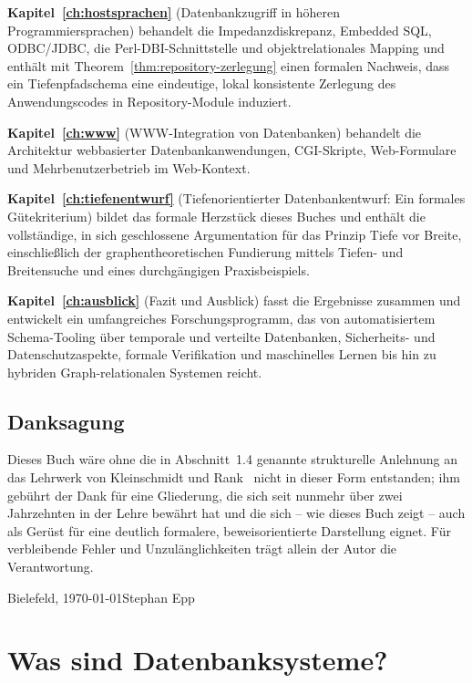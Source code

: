 ﻿\documentclass[a4paper,12pt]{report}
\theoremstyle{definition}
\theoremstyle{remark}
\begin{document}
\textbf{Kapitel~\ref{ch:hostsprachen}} (\glqq Datenbankzugriff in
höheren Programmiersprachen\grqq{}) behandelt die
Impedanzdiskrepanz, Embedded SQL, ODBC/JDBC, die Perl-DBI-Schnittstelle
und objektrelationales Mapping und enthält mit
Theorem~\ref{thm:repository-zerlegung} einen formalen Nachweis, dass
ein Tiefenpfadschema eine eindeutige, lokal konsistente Zerlegung des
Anwendungscodes in Repository-Module induziert.

\textbf{Kapitel~\ref{ch:www}} (\glqq WWW-Integration von
Datenbanken\grqq{}) behandelt die Architektur webbasierter
Datenbankanwendungen, CGI-Skripte, Web-Formulare und
Mehrbenutzerbetrieb im Web-Kontext.

\textbf{Kapitel~\ref{ch:tiefenentwurf}} (\glqq Tiefenorientierter
Datenbankentwurf: Ein formales Gütekriterium\grqq{}) bildet das
formale Herzstück dieses Buches und enthält die vollständige,
in sich geschlossene Argumentation für das Prinzip
\glqq Tiefe vor Breite\grqq{}, einschließlich der
graphentheoretischen Fundierung mittels Tiefen- und Breitensuche und
eines durchgängigen Praxisbeispiels.

\textbf{Kapitel~\ref{ch:ausblick}} (\glqq Fazit und Ausblick\grqq{})
fasst die Ergebnisse zusammen und entwickelt ein umfangreiches
Forschungsprogramm, das von automatisiertem Schema-Tooling über
temporale und verteilte Datenbanken, Sicherheits- und
Datenschutzaspekte, formale Verifikation und maschinelles Lernen bis
hin zu hybriden Graph-relationalen Systemen reicht.

\section*{Danksagung}

Dieses Buch wäre ohne die in Abschnitt~1.4 genannte strukturelle
Anlehnung an das Lehrwerk von Kleinschmidt und
Rank~\cite{Kleinschmidt2002} nicht in dieser Form entstanden; ihm
gebührt der Dank für eine Gliederung, die sich seit nunmehr über zwei
Jahrzehnten in der Lehre bewährt hat und die sich -- wie dieses Buch
zeigt -- auch als Gerüst für eine deutlich formalere, beweisorientierte
Darstellung eignet. Für verbleibende Fehler und Unzulänglichkeiten
trägt allein der Autor die Verantwortung.

\bigskip
\noindent Bielefeld, \today \hfill Stephan Epp

\chapter{Was sind Datenbanksysteme?}
\label{ch:einleitung}
\end{document}
